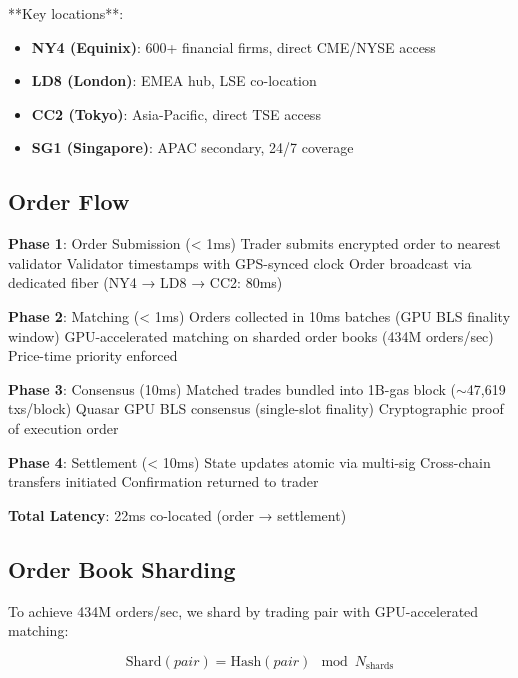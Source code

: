 \documentclass[11pt,letterpaper]{article}
\begin{document}
**Key locations**:
\begin{itemize}
    \item \textbf{NY4 (Equinix)}: 600+ financial firms, direct CME/NYSE access
    \item \textbf{LD8 (London)}: EMEA hub, LSE co-location
    \item \textbf{CC2 (Tokyo)}: Asia-Pacific, direct TSE access
    \item \textbf{SG1 (Singapore)}: APAC secondary, 24/7 coverage
\end{itemize}

\subsection{Order Flow}

\begin{algorithm}
\caption{Lightspeed Order Execution}
\begin{algorithmic}
\STATE \textbf{Phase 1}: Order Submission (< 1ms)
\STATE Trader submits encrypted order to nearest validator
\STATE Validator timestamps with GPS-synced clock
\STATE Order broadcast via dedicated fiber (NY4 → LD8 → CC2: 80ms)

\STATE \textbf{Phase 2}: Matching (< 1ms)
\STATE Orders collected in 10ms batches (GPU BLS finality window)
\STATE GPU-accelerated matching on sharded order books (434M orders/sec)
\STATE Price-time priority enforced

\STATE \textbf{Phase 3}: Consensus (10ms)
\STATE Matched trades bundled into 1B-gas block ($\sim$47,619 txs/block)
\STATE Quasar GPU BLS consensus (single-slot finality)
\STATE Cryptographic proof of execution order

\STATE \textbf{Phase 4}: Settlement (< 10ms)
\STATE State updates atomic via multi-sig
\STATE Cross-chain transfers initiated
\STATE Confirmation returned to trader

\STATE \textbf{Total Latency}: 22ms co-located (order → settlement)
\end{algorithmic}
\end{algorithm}

\subsection{Order Book Sharding}

To achieve 434M orders/sec, we shard by trading pair with GPU-accelerated matching:

\begin{equation}
\text{Shard}(pair) = \text{Hash}(pair) \mod N_{\text{shards}}
\end{equation}
\end{document}
